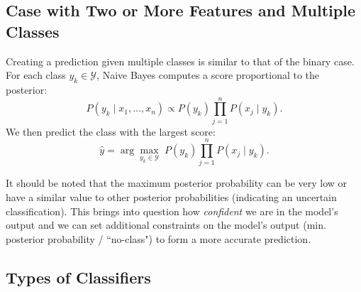 \documentclass{article}
\begin{document}

\subsection{Case with Two or More Features and Multiple Classes}
Creating a prediction given multiple classes is similar to that of the binary case. For each class $y_k\in\mathcal{Y}$, Naive Bayes computes a score proportional to the posterior:
\[
P(y_k\mid x_1,\dots,x_n)\propto P(y_k)\prod_{j=1}^n P(x_j\mid y_k).
\]
We then predict the class with the largest score:
\[
\hat{y}=\arg\max_{y_k\in\mathcal{Y}} \; P(y_k)\prod_{j=1}^n P(x_j\mid y_k).
\]

It should be noted that the maximum posterior probability can be very low or have a similar value to other posterior probabilities (indicating an uncertain classification). This brings into question how \textit{confident} we are in the model's output and we can set additional constraints on the model's output (min. posterior probability / ``no-class") to form a more accurate prediction. 


\subsection{Types of Classifiers}
\end{document}
